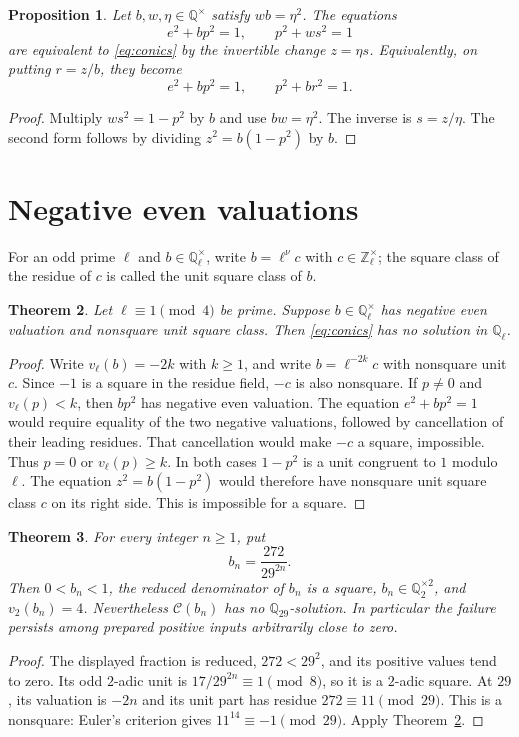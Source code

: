 \documentclass[10pt,a4paper]{article}
\newtheorem{theorem}{Theorem}[section]
\newtheorem{proposition}[theorem]{Proposition}
\newcommand{\Q}{\mathbb Q}
\newcommand{\Z}{\mathbb Z}
\begin{document}
\begin{proposition}\label{prop:detector}
Let $b,w,\eta\in\Q^\times$ satisfy $wb=\eta^2$.
The equations
\[
 e^2+bp^2=1,\qquad p^2+ws^2=1
\]
are equivalent to \eqref{eq:conics} by the invertible change
$z=\eta s$. Equivalently, on putting $r=z/b$, they become
\[
 e^2+bp^2=1,\qquad p^2+br^2=1.
\]
\end{proposition}
\begin{proof}
Multiply $ws^2=1-p^2$ by $b$ and use $bw=\eta^2$.
The inverse is $s=z/\eta$. The second form follows by dividing
$z^2=b(1-p^2)$ by $b$.
\end{proof}

\section{Negative even valuations}
For an odd prime $\ell$ and $b\in\Q_\ell^\times$, write
$b=\ell^\nu c$ with $c\in\Z_\ell^\times$; the square class of
the residue of $c$ is called the unit square class of $b$.

\begin{theorem}\label{thm:even}
Let $\ell\equiv1\pmod4$ be prime. Suppose $b\in\Q_\ell^\times$
has negative even valuation and nonsquare unit square class.
Then \eqref{eq:conics} has no solution in $\Q_\ell$.
\end{theorem}
\begin{proof}
Write $v_\ell(b)=-2k$ with $k\ge1$, and write
$b=\ell^{-2k}c$ with nonsquare unit $c$. Since $-1$ is a square
in the residue field, $-c$ is also nonsquare.
If $p\ne0$ and $v_\ell(p)<k$, then $bp^2$ has negative even
valuation. The equation $e^2+bp^2=1$ would require equality of the
two negative valuations, followed by cancellation of their leading
residues. That cancellation would make $-c$ a square, impossible.
Thus $p=0$ or $v_\ell(p)\ge k$. In both cases $1-p^2$ is a unit
congruent to $1$ modulo $\ell$. The equation $z^2=b(1-p^2)$
would therefore have nonsquare unit square class $c$ on its right
side. This is impossible for a square.
\end{proof}

\begin{theorem}\label{thm:family}
For every integer $n\ge1$, put
\[
                 b_n=\frac{272}{29^{2n}}.
\]
Then $0<b_n<1$, the reduced denominator of $b_n$ is a square,
$b_n\in\Q_2^{\times2}$, and $v_2(b_n)=4$.
Nevertheless $\mathcal C(b_n)$ has no $\Q_{29}$-solution.
In particular the failure persists among prepared positive inputs
arbitrarily close to zero.
\end{theorem}
\begin{proof}
The displayed fraction is reduced, $272<29^2$, and its positive
values tend to zero. Its odd $2$-adic unit is
$17/29^{2n}\equiv1\pmod8$, so it is a $2$-adic square.
At $29$, its valuation is $-2n$ and its unit part has residue
$272\equiv11\pmod{29}$. This is a nonsquare: Euler's criterion gives
$11^{14}\equiv-1\pmod{29}$. Apply Theorem~\ref{thm:even}.
\end{proof}
\end{document}
